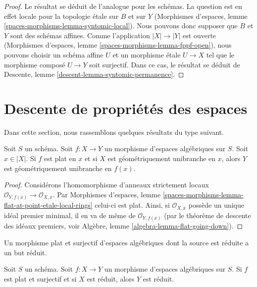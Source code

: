 \begin{proof}
Le résultat se déduit de l'analogue pour les schémas.
La question est en effet locale pour la topologie \'etale sur $B$ et sur $Y$
(Morphismes d'espaces, lemme
\ref{spaces-morphisms-lemma-syntomic-local}).
Nous pouvons donc supposer que $B$ et $Y$ sont des
schémas affines. Comme l'application $|X| \to |Y|$ est ouverte
(Morphismes d'espaces, lemme \ref{spaces-morphisms-lemma-fppf-open}),
nous pouvons choisir un
schéma affine $U$ et un morphisme \'etale $U \to X$ tel que le
morphisme composé $U \to Y$ soit surjectif. Dans ce cas, le résultat
se déduit de Descente, lemme
\ref{descent-lemma-syntomic-permanence}.
\end{proof}




\section{Descente de propriétés des espaces}
\label{section-descending-properties-spaces}

\noindent
Dans cette section, nous rassemblons quelques résultats du type suivant.

\begin{lemma}
\label{lemma-descend-unibranch}
Soit $S$ un schéma.
Soit $f : X \to Y$ un morphisme d'espaces algébriques sur $S$.
Soit $x \in |X|$.
Si $f$ est plat en $x$ et si $X$ est géométriquement unibranche en $x$, alors $Y$ est
géométriquement unibranche en $f(x)$.
\end{lemma}

\begin{proof}
Considérons l'homomorphisme d'anneaux strictement locaux
$\mathcal{O}_{Y, f(\overline{x})} \to \mathcal{O}_{X, \overline{x}}$.
Par
Morphismes d'espaces, lemme
\ref{spaces-morphisms-lemma-flat-at-point-etale-local-rings}
celui-ci est plat. Ainsi, si $\mathcal{O}_{X, \overline{x}}$ possède un unique idéal premier minimal,
il en va de même de $\mathcal{O}_{Y, f(\overline{x})}$ (par le théorème de descente des idéaux premiers, voir
Algèbre, lemme \ref{algebra-lemma-flat-going-down}).
\end{proof}

\begin{lemma}
\label{lemma-descend-reduced}
\begin{slogan}
Un morphisme plat et surjectif d'espaces algébriques dont la source est réduite
a un but réduit.
\end{slogan}
Soit $S$ un schéma.
Soit $f : X \to Y$ un morphisme d'espaces algébriques sur $S$.
Si $f$ est plat et surjectif et si $X$ est réduit, alors $Y$ est réduit.
\end{lemma}

